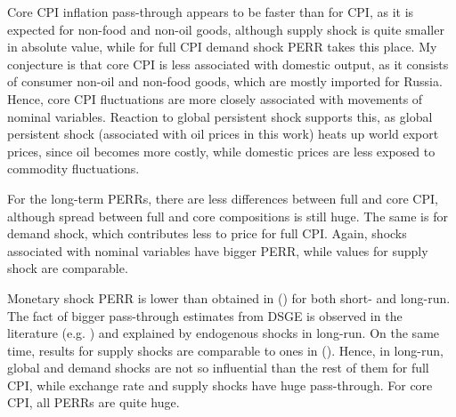 \documentclass[12pt, a4paper]{extarticle}
\begin{document}
Core CPI inflation pass-through appears to be faster than for CPI, as it is expected for non-food and non-oil goods, although supply shock is quite smaller in absolute value, while for full CPI demand shock PERR takes this place. My conjecture is that core CPI is less associated with domestic output, as it consists of consumer non-oil and non-food goods, which are mostly imported for Russia. Hence, core CPI fluctuations are more closely associated with movements of nominal variables. Reaction to global persistent shock supports this, as global persistent shock (associated with oil prices in this work) heats up world export prices, since oil becomes more costly, while domestic prices are less exposed to commodity fluctuations. 

For the long-term PERRs, there are less differences between full and core CPI, although spread between full and core compositions is still huge. The same is for demand shock, which contributes less to price for full CPI. Again, shocks associated with nominal variables have bigger PERR, while values for supply shock are comparable.

Monetary shock PERR is lower than obtained in (\cite[p. 9]{Khotulev2020}) for both short- and long-run. The fact of bigger pass-through estimates from DSGE is observed in the literature (e.g. \cite{Comunale2020}) and explained by endogenous shocks in long-run. On the same time, results for supply shocks are comparable to ones in (\cite{Forbes2018}). Hence, in long-run, global and demand shocks are not so influential than the rest of them for full CPI, while exchange rate and supply shocks have huge pass-through. For core CPI, all PERRs are quite huge. 
\end{document}
